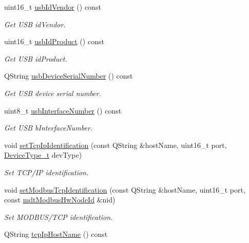 \begin{DoxyCompactItemize}
uint16\-\_\-t \hyperlink{classmdt_device_address_ab0178e6097602990d88983ab0641dea4}{usb\-Id\-Vendor} () const 
\begin{DoxyCompactList}\small\item\em Get U\-S\-B id\-Vendor. \end{DoxyCompactList}\item 
uint16\-\_\-t \hyperlink{classmdt_device_address_a5a6a8f926ba207d3775f32d9b26f0825}{usb\-Id\-Product} () const 
\begin{DoxyCompactList}\small\item\em Get U\-S\-B id\-Product. \end{DoxyCompactList}\item 
Q\-String \hyperlink{classmdt_device_address_a922a6382cc42f9783004fd227527a68e}{usb\-Device\-Serial\-Number} () const 
\begin{DoxyCompactList}\small\item\em Get U\-S\-B device serial number. \end{DoxyCompactList}\item 
uint8\-\_\-t \hyperlink{classmdt_device_address_a85d1e0633701a5da36a7901fd46ceaff}{usb\-Interface\-Number} () const 
\begin{DoxyCompactList}\small\item\em Get U\-S\-B b\-Interface\-Number. \end{DoxyCompactList}\item 
void \hyperlink{classmdt_device_address_a17ab6e31ce07265b70fac6a6663306cc}{set\-Tcp\-Ip\-Identification} (const Q\-String \&host\-Name, uint16\-\_\-t port, \hyperlink{classmdt_device_address_a8e776267826886cd846fb2d75b9b7b2b}{Device\-Type\-\_\-t} dev\-Type)
\begin{DoxyCompactList}\small\item\em Set T\-C\-P/\-I\-P identification. \end{DoxyCompactList}\item 
void \hyperlink{classmdt_device_address_a0c93210a120c74f81c1b54b11129ff17}{set\-Modbus\-Tcp\-Identification} (const Q\-String \&host\-Name, uint16\-\_\-t port, const \hyperlink{classmdt_modbus_hw_node_id}{mdt\-Modbus\-Hw\-Node\-Id} \&nid)
\begin{DoxyCompactList}\small\item\em Set M\-O\-D\-B\-U\-S/\-T\-C\-P identification. \end{DoxyCompactList}\item 
Q\-String \hyperlink{classmdt_device_address_ae4a8981a6d6c9a84e0b8db84bf823fd1}{tcp\-Ip\-Host\-Name} () const 

\end{DoxyCompactItemize}
